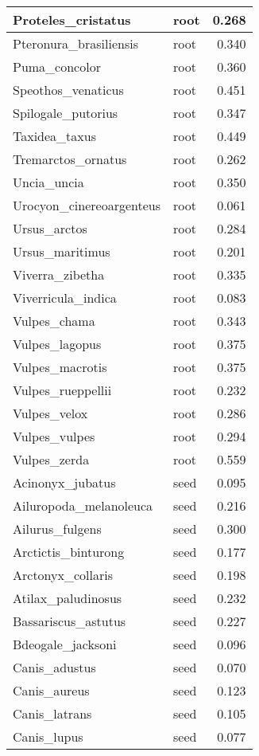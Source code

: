 \begin{table}
\begin{tabular}[t]{l|l|r}
\hline
Proteles\_cristatus & root & 0.268\\
\hline
Pteronura\_brasiliensis & root & 0.340\\
\hline
Puma\_concolor & root & 0.360\\
\hline
Speothos\_venaticus & root & 0.451\\
\hline
Spilogale\_putorius & root & 0.347\\
\hline
Taxidea\_taxus & root & 0.449\\
\hline
Tremarctos\_ornatus & root & 0.262\\
\hline
Uncia\_uncia & root & 0.350\\
\hline
Urocyon\_cinereoargenteus & root & 0.061\\
\hline
Ursus\_arctos & root & 0.284\\
\hline
Ursus\_maritimus & root & 0.201\\
\hline
Viverra\_zibetha & root & 0.335\\
\hline
Viverricula\_indica & root & 0.083\\
\hline
Vulpes\_chama & root & 0.343\\
\hline
Vulpes\_lagopus & root & 0.375\\
\hline
Vulpes\_macrotis & root & 0.375\\
\hline
Vulpes\_rueppellii & root & 0.232\\
\hline
Vulpes\_velox & root & 0.286\\
\hline
Vulpes\_vulpes & root & 0.294\\
\hline
Vulpes\_zerda & root & 0.559\\
\hline
Acinonyx\_jubatus & seed & 0.095\\
\hline
Ailuropoda\_melanoleuca & seed & 0.216\\
\hline
Ailurus\_fulgens & seed & 0.300\\
\hline
Arctictis\_binturong & seed & 0.177\\
\hline
Arctonyx\_collaris & seed & 0.198\\
\hline
Atilax\_paludinosus & seed & 0.232\\
\hline
Bassariscus\_astutus & seed & 0.227\\
\hline
Bdeogale\_jacksoni & seed & 0.096\\
\hline
Canis\_adustus & seed & 0.070\\
\hline
Canis\_aureus & seed & 0.123\\
\hline
Canis\_latrans & seed & 0.105\\
\hline
Canis\_lupus & seed & 0.077\\

\end{tabular}
\end{table}
